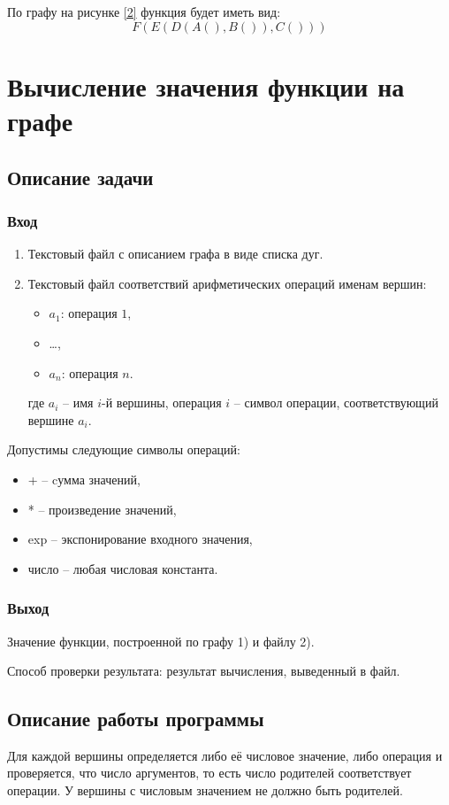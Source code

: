 \documentclass[bachelor, och, pract_otchet]{SCWorks}
\begin{document}
По графу на рисунке \ref{2} функция будет иметь вид:
\[ F(E(D(A(), B()), C())) \]

\section{Вычисление значения функции на графе}
\subsection{Описание задачи}
\subsubsection{Вход}
\begin{enumerate}
  \item Текстовый файл с описанием графа в виде списка дуг.
  \item Текстовый файл соответствий арифметических операций именам вершин:
  \begin{itemize}
    \item $a_1$: операция $1$,
    \item \dots,
    \item $a_n$: операция $n$.
  \end{itemize}
  где $a_i$ -- имя $i$-й вершины, операция $i$ -- символ операции, соответствующий вершине $a_i$.
\end{enumerate}

Допустимы следующие символы операций: 
\begin{itemize}
  \item + -- cумма значений,
  \item * --  произведение значений,
  \item exp -- экспонирование входного значения,
  \item число -- любая числовая константа.		
\end{itemize}

\subsubsection{Выход}
Значение функции, построенной по графу 1) и файлу 2). 

Способ проверки результата: результат вычисления, выведенный в файл.

\subsection{Описание работы программы}
Для каждой вершины определяется либо её числовое значение, либо операция и проверяется,
что число аргументов, то есть число родителей соответствует операции. 
У вершины с числовым значением не должно быть родителей.
\end{document}
